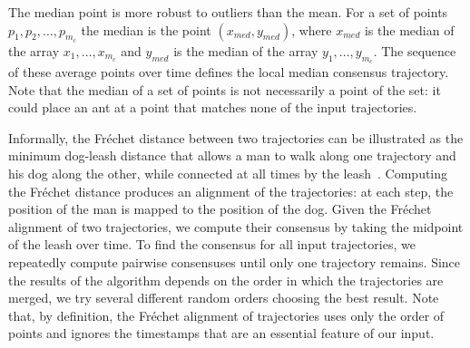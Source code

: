 \documentclass{llncs}
\newcommand{\Frechet}[0]{Fr\'{e}chet}
\begin{document}
The median point is more robust to outliers than the mean.
For a set of points $p_1,p_2, \dots, p_{m_c}$
the median is
the point $(x_{med}, y_{med})$, where $x_{med}$ is the median of the
array $x_1, \dots, x_{m_c}$ and $y_{med}$ is
the median of the array $y_1, \dots, y_{m_c}$. The sequence of these
average points over time defines the local median consensus trajectory.
Note that the median of a set of points is not necessarily a point of
the set: it could place an ant at a point that matches none of the input trajectories.

\medskip





\noindent{\bf Local \Frechet{}:}
Informally, the \Frechet{} distance between two trajectories can be illustrated as the
minimum dog-leash distance that allows a
man to walk along one trajectory and his dog along the other, while connected at all times by the leash~\cite{DBLP:journals/ijcga/AltG95}. Computing
the \Frechet{} distance produces an alignment of the trajectories:
at each step, the position of the man is mapped to the position of the
dog. Given the \Frechet{} alignment of two trajectories, we compute their
consensus by taking the midpoint of the leash over time.
To find the consensus for all input trajectories, we repeatedly
compute pairwise consensuses until only one trajectory remains.
Since the results of the algorithm depends on the order in which the
trajectories are merged, we try several different random orders
choosing the best result. Note that, by definition, the
\Frechet{} alignment of trajectories uses only the order of points and
ignores the timestamps that are an essential feature of our input.
\end{document}
